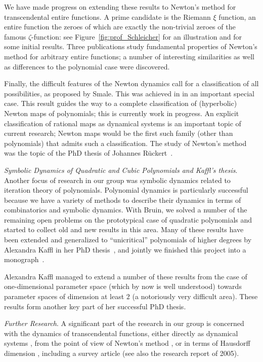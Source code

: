 We have made progress on extending these results to Newton's method for transcendental entire functions. A prime candidate is the Riemann $\xi$ function, an entire function the zeroes of which are exactly the non-trivial zeroes of the famous $\zeta$-function: see Figure~\ref{fig:prof_Schleicher} for an illustration and \cite{NewtonOutline} for some initial results. Three publications \cite{NewtonSebastian,BuffRueckert,NewtonEntire} study fundamental properties of Newton's method for arbitrary entire functions; a number of interesting similarities as well as differences to the polynomial case were discovered.

Finally, the difficult features of the Newton dynamics call for a classification of all possibilities, as proposed by Smale. This was achieved in \cite{NewtonJohannes} in an important special case. This result guides the way to a complete classification of (hyperbolic) Newton maps of polynomials; this is currently work in progress. An explicit classification of rational maps as dynamical systems is an important topic of current research; Newton maps would be the first such family (other than polynomials) that admits such a classification.
The study of Newton's method was the topic of the PhD thesis of Johannes R\"uckert~\cite{JohannesThesis}.

{\sl Symbolic Dynamics of Quadratic and Cubic Polynomials and Kaffl's thesis}.
Another focus of research in our group was symbolic dynamics related to iteration theory of polynomials. Polynomial dynamics is particularly successful because we have a variety of methods to describe their dynamics in terms of combinatorics and symbolic dynamics. With Bruin, we solved a number of the remaining open problems on the prototypical case of quadratic polynomials and started to collect old and new results in this area. Many of these results have been extended and generalized to ``unicritical'' polynomials of higher degrees by Alexandra Kaffl \cite{Alex1} in her PhD thesis~\cite{AlexThesis}, and jointly we finished this project into a monograph~\cite{SymDyn}.

Alexandra Kaffl managed to extend a number of these results from the case of one-dimensional parameter space (which by now is well understood) towards parameter spaces of dimension at least $2$ (a notoriously very difficult area). These results form another key part of her successful PhD thesis.

{\sl Further Research}.
A significant part of the research in our group is concerned with the dynamics of transcendental functions, either directly as dynamical systems \cite{ExpoSpiders, ExpoPSP,EscCosine, ExpoEscClass,ExpoBifComb,ExpoBif, ExpoParaRays}, from the point of view of Newton's method \cite{NewtonSebastian,BuffRueckert,NewtonEntire}, or in terms of Hausdorff dimension \cite{Cosine}, including a survey article \cite{Hausdorff} (see also the research report of 2005).

